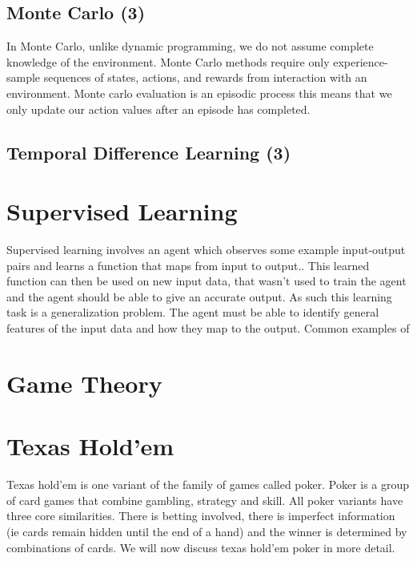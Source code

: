 \subsection{Monte Carlo (3)}\label{subsec:mc}
In Monte Carlo, unlike dynamic programming, we do not assume complete knowledge of the environment.
Monte Carlo methods require only experience-sample sequences of states, actions, and rewards from interaction with
an environment\citep{sutton1998reinforcement}.
Monte carlo evaluation is an episodic process this means that we only update our action values after an episode
has completed.


\subsection{Temporal Difference Learning (3)}\label{subsec:td}


\section{Supervised Learning}\label{sec:supervisedLearning}
Supervised learning involves an agent which observes some example input-output pairs and learns
a function that maps from input to output.\citep{russell2016artificial}.
This learned function can then be used on new input data, that wasn't used to train the agent and the
agent should be able to give an accurate output.
As such this learning task is a generalization problem.
The agent must be able to identify general features of the input data and how they map to the output.
Common examples of

\section{Game Theory}\label{sec:gameTheory}

\section{Texas Hold'em}\label{sec:thIntro}
Texas hold'em is one variant of the family of games called poker.
Poker is a group of card games that combine gambling, strategy and skill.
All poker variants have three core similarities.
There is betting involved, there is imperfect information (ie cards remain hidden until the end of a hand)
and the winner is determined by combinations of cards.
We will now discuss texas hold'em poker in more detail.

